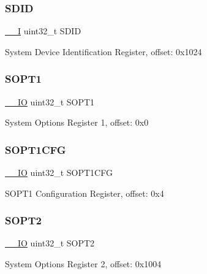 \subsubsection{\texorpdfstring{SDID}{SDID}}
{\footnotesize\ttfamily \mbox{\hyperlink{core__cm0plus_8h_af63697ed9952cc71e1225efe205f6cd3}{\+\_\+\+\_\+I}} uint32\+\_\+t S\+D\+ID}

System Device Identification Register, offset\+: 0x1024 \mbox{\label{struct_s_i_m___type_a2dd2ae7d066d4b4240fe56f72f0f7095}} 
\subsubsection{\texorpdfstring{SOPT1}{SOPT1}}
{\footnotesize\ttfamily \mbox{\hyperlink{core__cm0plus_8h_aec43007d9998a0a0e01faede4133d6be}{\+\_\+\+\_\+\+IO}} uint32\+\_\+t S\+O\+P\+T1}

System Options Register 1, offset\+: 0x0 \mbox{\label{struct_s_i_m___type_ae691410c960f357d63ab3b479cb59641}} 
\subsubsection{\texorpdfstring{SOPT1CFG}{SOPT1CFG}}
{\footnotesize\ttfamily \mbox{\hyperlink{core__cm0plus_8h_aec43007d9998a0a0e01faede4133d6be}{\+\_\+\+\_\+\+IO}} uint32\+\_\+t S\+O\+P\+T1\+C\+FG}

S\+O\+P\+T1 Configuration Register, offset\+: 0x4 \mbox{\label{struct_s_i_m___type_a3f8dc2ae265d799ec159ccd2c2fddabd}} 
\subsubsection{\texorpdfstring{SOPT2}{SOPT2}}
{\footnotesize\ttfamily \mbox{\hyperlink{core__cm0plus_8h_aec43007d9998a0a0e01faede4133d6be}{\+\_\+\+\_\+\+IO}} uint32\+\_\+t S\+O\+P\+T2}

System Options Register 2, offset\+: 0x1004 \mbox{\label{struct_s_i_m___type_a5e152370dc7f083dff49c4e56e669435}} 
